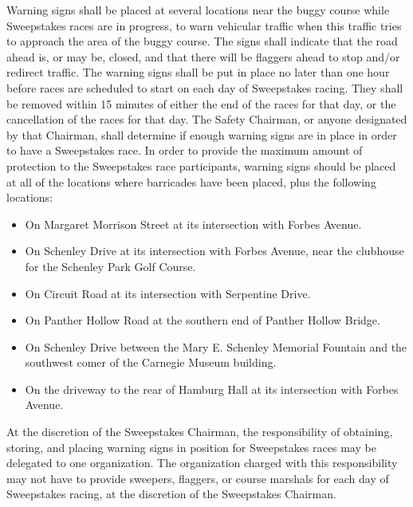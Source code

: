 	Warning signs shall be placed at several locations near the buggy course while
	Sweepstakes races are in progress, to warn vehicular traffic when this traffic
	tries to approach the area of the buggy course. The signs shall indicate that
	the road ahead is, or may be, closed, and that there will be flaggers ahead to
	stop and/or redirect traffic. The warning signs shall be put in place no later
	than one hour before races are scheduled to start on each day of Sweepstakes
	racing. They shall be removed within 15 minutes of either the end of the races
	for that day, or the cancellation of the races for that day. The Safety
	Chairman, or anyone designated by that Chairman, shall determine if enough
	warning signs are in place in order to have a Sweepstakes race. In order to
	provide the maximum amount of protection to the Sweepstakes race participants,
	warning signs should be placed at all of the locations where barricades have
	been placed, plus the following locations:

	\begin{itemize}

		\item On Margaret Morrison Street at its intersection with Forbes Avenue.

		\item On Schenley Drive at its intersection with Forbes Avenue, near the
		clubhouse for the Schenley Park Golf Course.

		\item On Circuit Road at its intersection with Serpentine Drive.

		\item On Panther Hollow Road at the southern end of Panther Hollow Bridge.

		\item On Schenley Drive between the Mary E. Schenley Memorial Fountain and
		the southwest comer of the Carnegie Museum building.

		\item On the driveway to the rear of Hamburg Hall at its intersection with
		Forbes Avenue.

	\end{itemize}

	At the discretion of the Sweepstakes Chairman, the responsibility of obtaining,
	storing, and placing warning signs in position for Sweepstakes races may be
	delegated to one organization. The organization charged with this
	responsibility may not have to provide sweepers, flaggers, or course marshals
	for each day of Sweepstakes racing, at the discretion of the Sweepstakes
	Chairman.

